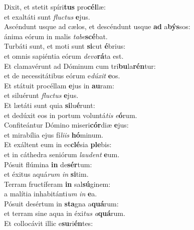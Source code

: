 \oddverse Dixit, et stetit spíri\textbf{tus} pro\textbf{cél}læ:~\*\\
\oddverse et exaltáti sunt \textit{flu}\textit{ctus} \textbf{e}jus.\\
\evenverse Ascéndunt usque ad cælos, et descéndunt usque \textbf{ad} a\textbf{býs}sos:~\*\\
\evenverse ánima eórum in malis \textit{ta}\textit{be}\textbf{scé}bat.\\
\oddverse Turbáti sunt, et moti sunt \textbf{si}cut \textbf{é}brius:~\*\\
\oddverse et omnis sapiéntia eórum \textit{de}\textit{vo}\textbf{rá}ta est.\\
\evenverse Et clamavérunt ad Dóminum cum tri\textbf{bu}la\textbf{rén}tur:~\*\\
\evenverse et de necessitátibus eórum e\textit{dú}\textit{xit} \textbf{e}os.\\
\oddverse Et státuit procéllam \textbf{e}jus in \textbf{au}ram:~\*\\
\oddverse et siluérunt \textit{flu}\textit{ctus} \textbf{e}jus.\\
\evenverse Et lætáti sunt quia \textbf{si}lu\textbf{é}runt:~\*\\
\evenverse et dedúxit eos in portum voluntá\textit{tis} \textit{e}\textbf{ó}rum.\\
\oddverse Confiteántur Dómino miseri\textbf{cór}diæ \textbf{e}jus:~\*\\
\oddverse et mirabília ejus fí\textit{li}\textit{is} \textbf{hó}minum.\\
\evenverse Et exáltent eum in ec\textbf{clé}sia \textbf{ple}bis:~\*\\
\evenverse et in cáthedra seniórum \textit{lau}\textit{dent} \textbf{e}um.\\
\oddverse Pósuit flúmina \textbf{in} de\textbf{sér}tum:~\*\\
\oddverse et éxitus aquá\textit{rum} \textit{in} \textbf{si}tim.\\
\evenverse Terram fructíferam \textbf{in} sal\textbf{sú}ginem:~\*\\
\evenverse a malítia inhabitánti\textit{um} \textit{in} \textbf{e}a.\\
\oddverse Pósuit desértum in \textbf{sta}gna a\textbf{quá}rum:~\*\\
\oddverse et terram sine aqua in éxi\textit{tus} \textit{a}\textbf{quá}rum.\\
\evenverse Et collocávit illic e\textbf{su}ri\textbf{én}tes:~\*\\
